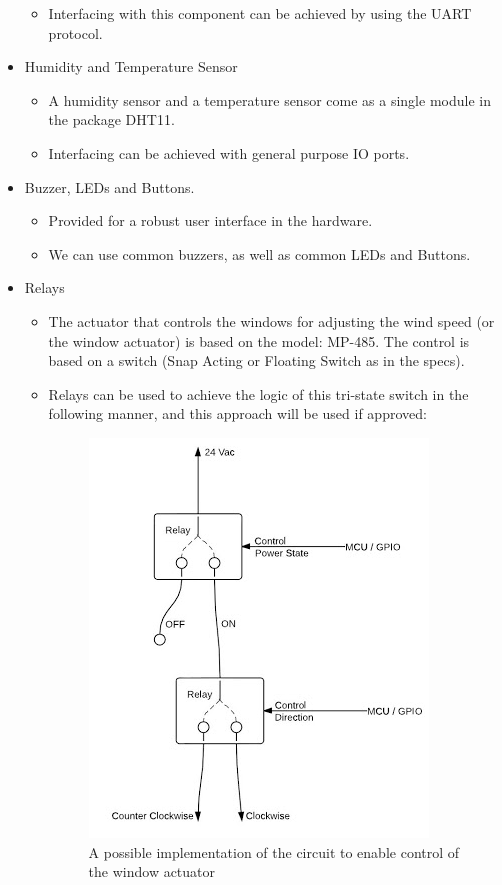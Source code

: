 \begin{itemize}
\begin{itemize}
					\item Interfacing with this component can be achieved by using the UART protocol.
				\end{itemize}
				\item Humidity and Temperature Sensor
				\begin{itemize}
					\item A humidity sensor and a temperature sensor come as a single module in the package DHT11.
					\item Interfacing can be achieved with general purpose IO ports.
				\end{itemize}
				\item Buzzer, LEDs and Buttons.
				\begin{itemize}
					\item Provided for a robust user interface in the hardware.
					\item We can use common buzzers, as well as common LEDs and Buttons.
				\end{itemize}
				\item Relays
				\begin{itemize}
					\item The actuator that controls the windows for adjusting the wind speed (or the window actuator) is based on the model: MP-485. The control is based on a switch (Snap Acting or Floating Switch as in the specs).
					\item Relays can be used to achieve the logic of this tri-state switch in the following manner, and this approach will be used if approved:
					\begin{figure}[H]
						\centering
							\includegraphics[scale=0.60]{img/relay-circuit}
						\caption{A possible implementation of the circuit to enable control of the window actuator}
					\end{figure}

				\end{itemize}
			\end{itemize}
\newpage